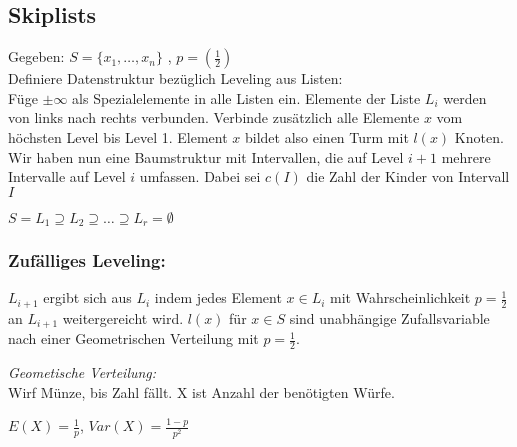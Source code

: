         \subsection{Skiplists} 
            Gegeben: $S = \{ x_1, \ldots, x_n \}$ , $p=(\frac{1}{2})$ \\            
            Definiere Datenstruktur bezüglich Leveling aus Listen: \\
            Füge $\pm \infty$ als Spezialelemente in alle Listen ein. Elemente der Liste $L_i$ werden von links nach rechts verbunden. Verbinde zusätzlich alle Elemente $x$ vom höchsten Level bis Level 1. Element $x$ bildet also einen Turm mit $l(x)$ Knoten. Wir haben nun eine Baumstruktur mit Intervallen, die auf Level $i+1$ mehrere Intervalle auf Level $i$ umfassen. Dabei sei $c(I)$ die Zahl der Kinder von Intervall $I$           
            
            $S= L_1 \supseteq L_2 \supseteq \ldots \supseteq L_r=\emptyset$
            
            \subsubsection{Zufälliges Leveling:}
            
            
            
            $L_{i+1}$ ergibt sich aus $L_i$ indem jedes Element $x\in L_i$ mit Wahrscheinlichkeit $p=\frac{1}{2}$ an $L_{i+1}$ weitergereicht wird.
            $l(x)$ für $x\in S$ sind unabhängige Zufallsvariable nach einer Geometrischen Verteilung mit $p=\frac{1}{2}$.
            
            \emph{Geometische Verteilung:}\\
            Wirf Münze, bis Zahl fällt. X ist Anzahl der benötigten Würfe.
            
            $E(X)=\frac{1}{p}$, $Var(X)=\frac{1-p}{p^2}$\\\\
            
